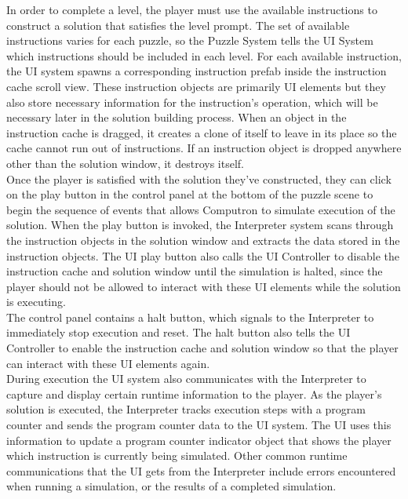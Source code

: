 In order to complete a level, the player must use the available instructions to construct a solution that satisfies the level prompt. The set of available instructions varies for each puzzle, so the Puzzle System tells the UI System which instructions should be included in each level.  For each available instruction, the UI system spawns a corresponding instruction prefab inside the instruction cache scroll view. These instruction objects are primarily UI elements but they also store necessary information for the instruction's operation, which will be necessary later in the solution building process. When an object in the instruction cache is dragged, it creates a clone of itself to leave in its place so the cache cannot run out of instructions. If an instruction object is dropped anywhere other than the solution window, it destroys itself.\\

Once the player is satisfied with the solution they've constructed, they can click on the play button in the control panel at the bottom of the puzzle scene to begin the sequence of events that allows Computron to simulate execution of the solution. When the play button is invoked, the Interpreter system scans through the instruction objects in the solution window and extracts the data stored in the instruction objects. The UI play button also calls the UI Controller to disable the instruction cache and solution window until the simulation is halted, since the player should not be allowed to interact with these UI elements while the solution is executing.\\

The control panel contains a halt button, which signals to the Interpreter to immediately stop execution and reset. The halt button also tells the UI Controller to enable the instruction cache and solution window so that the player can interact with these UI elements again.\\

During execution the UI system also communicates with the Interpreter to capture and display certain runtime information to the player. As the player's solution is executed, the Interpreter tracks execution steps with a program counter and sends the program counter data to the UI system. The UI uses this information to update a program counter indicator object that shows the player which instruction is currently being simulated. Other common runtime communications that the UI gets from the Interpreter include errors encountered when running a simulation, or the results of a completed simulation.\\